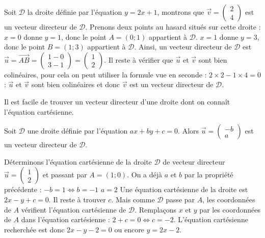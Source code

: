 	\begin{tip}[Exemple]
		Soit $\mathcal{D}$ la droite définie par l'équation $y = 2x + 1$, montrons que $\overrightarrow{v} = \begin{pmatrix} 2 \\ 4\end{pmatrix}$ est un vecteur directeur de $\mathcal{D}$.
		\newpar
		Prenons deux points au hasard situés sur cette droite :
		\newline
		$x = 0$ donne $y = 1$, donc le point $A = (0; 1)$ appartient à $\mathcal{D}$.
		\newline
		$x = 1$ donne $y = 3$, donc le point $B = (1; 3)$ appartient à $\mathcal{D}$.
		\newpar
		Ainsi, un vecteur directeur de $\mathcal{D}$ est $\overrightarrow{u} = \overrightarrow{AB} = \begin{pmatrix} 1-0 \\ 3-1\end{pmatrix} = \begin{pmatrix} 1 \\ 2\end{pmatrix}$.
		\newpar
		Il reste à vérifier que $\overrightarrow{u}$ et $\overrightarrow{v}$ sont bien colinéaires, pour cela on peut utiliser la formule vue en seconde :
		\newline
		$2 \times 2 - 1 \times 4 = 0$ : $\overrightarrow{u}$ et $\overrightarrow{v}$ sont bien colinéaires et donc $\overrightarrow{v}$ est un vecteur directeur de $\mathcal{D}$.
	\end{tip}

	Il est facile de trouver un vecteur directeur d'une droite dont on connaît l'équation cartésienne.

	\begin{formula}
		Soit $\mathcal{D}$ une droite définie par l'équation $ax + by + c = 0$. Alors $\overrightarrow{u} = \begin{pmatrix} -b \\ a\end{pmatrix}$ est un vecteur directeur de $\mathcal{D}$.
	\end{formula}

	\begin{tip}[Exemple]
		Déterminons l'équation cartésienne de la droite $\mathcal{D}$ de vecteur directeur $\overrightarrow{u} = \begin{pmatrix} 1 \\ 2\end{pmatrix}$ et passant par $A = (1; 0)$.
		\newpar
		On a déjà $a$ et $b$ par la propriété précédente :
		\newline
		$-b = 1 \iff b = -1$
		\newline
		$a = 2$
		\newpar
		Une équation cartésienne de la droite est $2x - y + c = 0$. Il reste à trouver $c$. Mais comme $\mathcal{D}$ passe par $A$, les coordonnées de $A$ vérifient l'équation cartésienne de $\mathcal{D}$.
		\newpar
		Remplaçons $x$ et $y$ par les coordonnées de $A$ dans l'équation cartésienne : $2 + c = 0 \iff c = -2$.
		\newpar
		L'équation cartésienne recherchée est donc $2x - y - 2 = 0$ ou encore $y = 2x - 2$.
	\end{tip}

